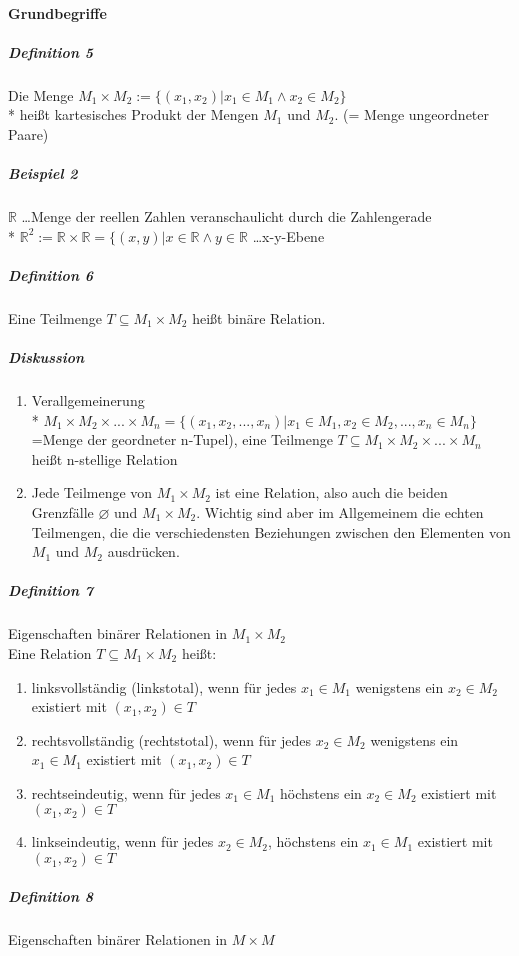 \documentclass[a4paper]{scrartcl}
\begin{document}
\paragraph{Grundbegriffe}
\subparagraph{Definition 5}
Die Menge $M_1 \times M_2 :=\{(x_1,x_2)\vert x_1 \in M_1 \wedge x_2 \in M_2\}$\\*
heißt kartesisches Produkt der Mengen $M_1$ und $M_2$. (= Menge ungeordneter Paare)
\subparagraph{Beispiel 2}
$\mathbb{R}$ \dots Menge der reellen Zahlen veranschaulicht durch die Zahlengerade\\*
$\mathbb{R}^2 := \mathbb{R} \times \mathbb{R} = \{ (x,y) \vert x \in \mathbb{R} \wedge y \in \mathbb{R}$ \dots x-y-Ebene
\subparagraph{Definition 6}
Eine Teilmenge $T\subseteq M_1 \times M_2$ heißt binäre Relation.
\subparagraph{Diskussion}
\begin{enumerate}
\item Verallgemeinerung\\*
$M_1 \times M_2 \times ... \times M_n = \{(x_1,x_2,...,x_n) \vert x_1 \in M_1, x_2 \in M_2, ..., x_n\in M_n\}$\\
=Menge der geordneter n-Tupel), eine Teilmenge $T\subseteq M_1 \times M_2 \times ... \times M_n$ heißt n-stellige Relation
\item Jede Teilmenge von $M_1 \times M_2$ ist eine Relation, also auch die beiden Grenzfälle $\varnothing$ und $M_1 \times M_2$. Wichtig sind aber im Allgemeinem die echten Teilmengen, die die verschiedensten Beziehungen zwischen den Elementen von $M_1$ und $M_2$ ausdrücken.
\end{enumerate}
\subparagraph{Definition 7}
Eigenschaften binärer Relationen in $M_1 \times M_2$\\
Eine Relation $T \subseteq M_1 \times M_2$ heißt:
\begin{enumerate}
\item linksvollständig (linkstotal), wenn für jedes $x_1 \in M_1$ wenigstens ein $x_2 \in M_2$ existiert mit $(x_1,x_2)\in T$\label{def7a}
\item rechtsvollständig (rechtstotal), wenn für jedes $x_2 \in M_2$ wenigstens ein $x_1 \in M_1$ existiert mit $(x_1,x_2) \in T$
\item rechtseindeutig, wenn für jedes $x_1 \in M_1$ höchstens ein $x_2 \in M_2$ existiert mit $(x_1,x_2) \in T$\label{def7c}
\item linkseindeutig, wenn für jedes $x_2 \in M_2$, höchstens ein $x_1 \in M_1$ existiert mit $(x_1,x_2) \in T$
\end{enumerate}
\subparagraph{Definition 8} Eigenschaften binärer Relationen in $M \times M$\\
\end{document}
